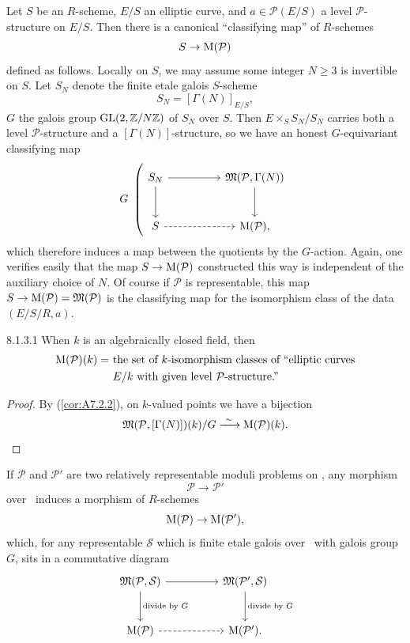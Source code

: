 \kmitem\label{item:8.1.3}
Let $S$ be an $R$-scheme, $E/S$ an elliptic curve, and $a \in \mathcal{P}(E/S)$ a level $\mathcal{P}$-structure on $E/S$. Then there is a canonical ``classifying map'' of $R$-schemes
\[
S \to \mathrm{M}(\mathcal{P})
\]
defined as follows. Locally on $S$, we may assume some integer $N \ge 3$ is invertible on $S$. Let $S_N$ denote the finite etale galois $S$-scheme
\[
S_N = [\Gamma(N)]_{E/S} ,
\]
$G$ the galois group $\operatorname{GL}(2, \mathbb{Z}/N\mathbb{Z})$ of $S_N$ over $S$. Then $E \times_S S_N/S_N$ carries both a level $\mathcal{P}$-structure and a $[\Gamma(N)]$-structure, so we have an honest $G$-equivariant classifying map
\[
G\ \left(
\begin{tikzcd}[column sep=huge, row sep=large]
S_N \arrow[r] \arrow[d] & \Mfrak(\mathcal{P}, \Gamma(N)) \arrow[d] \\
S \arrow[r, dashed] & \Mcoarse(\mathcal{P}) ,
\end{tikzcd}
\right.
\]
which therefore induces a map between the quotients by the $G$-action. Again, one verifies easily that the map $S \to \mathrm{M}(\mathcal{P})$ constructed this way is independent of the auxiliary choice of $N$. Of course if $\mathcal{P}$ is representable, this map $S \to \mathrm{M}(\mathcal{P}) = \mathfrak{M}(\mathcal{P})$ is the classifying map for the isomorphism class of the data $(E/S/R, a)$.

\begin{customlem}{8.1.3.1}\label{lem:8.1.3.1}
When $k$ is an algebraically closed field, then
\[
\begin{aligned}
\mathrm{M}(\mathcal{P})(k) =\ &\text{the set of $k$-isomorphism classes of ``elliptic curves} \\
&\text{$E/k$ with given level $\mathcal{P}$-structure.''}
\end{aligned}
\]
\end{customlem}

\begin{proof}
By (\ref{cor:A7.2.2}), on $k$-valued points we have a bijection
\[
\mathfrak{M}(\mathcal{P}, [\Gamma(N)])(k)/G \xrightarrow{\ \sim\ } \mathrm{M}(\mathcal{P})(k) . \qedhere
\]
\end{proof}

\kmitem\label{item:8.1.4}
If $\mathcal{P}$ and $\mathcal{P}'$ are two relatively representable moduli problems on \EllR, any morphism
\[
\mathcal{P} \to \mathcal{P}'
\]
over \EllR\ induces a morphism of $R$-schemes
\[
\mathrm{M}(\mathcal{P}) \to \mathrm{M}(\mathcal{P}') ,
\]
which, for any representable $\mathcal{S}$ which is finite etale galois over \EllR\ with galois group $G$, sits in a commutative diagram
\[
\begin{tikzcd}[column sep=huge, row sep=large]
\Mfrak(\mathcal{P}, \mathcal{S}) \arrow[r] \arrow[d, "{\text{divide by }G}"] & \Mfrak(\mathcal{P}', \mathcal{S}) \arrow[d, "{\text{divide by }G}"] \\
\Mcoarse(\mathcal{P}) \arrow[r, dashed] & \Mcoarse(\mathcal{P}') .
\end{tikzcd}
\]

